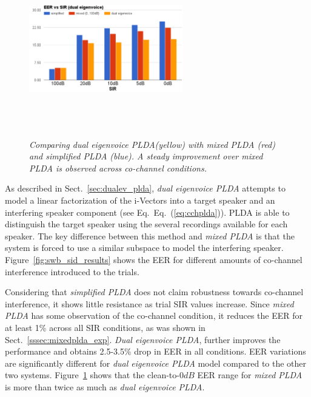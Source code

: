 \begin{figure}[b!]
	\centering
	\includegraphics[height = 3in, width=0.6\textwidth]{figures/eer_vs_sir_dualeigenvoice}
	\vspace{-2mm}
	\caption{\it \small Comparing {\it dual eigenvoice PLDA}(yellow) with {\it mixed PLDA} (red) and {\it simplified PLDA} (blue). A steady improvement over {\it mixed PLDA} is observed across co-channel conditions. }
	\label{fig:eer_dualeigenvoice}
	\vspace{-1mm}
\end{figure}

As described in Sect.~\ref{sec:dualev_plda}, {\it dual eigenvoice PLDA} attempts to model a linear factorization of the i-Vectors into a target speaker and an interfering speaker component (see Eq.~Eq.~(\ref{eq:cchplda})). 
PLDA is able to distinguish the target speaker using the several recordings available for each speaker. 
The key difference between this method and {\it mixed PLDA} is that the system is forced to use a similar subspace to model the interfering speaker. 
Figure~\ref{fig:swb_sid_results} shows the EER for different amounts of co-channel interference introduced to the trials. 

Considering that {\it simplified PLDA} does not claim robustness towards co-channel interference, it shows little resistance as trial SIR values increase. 
Since {\it mixed PLDA} has some observation of the co-channel condition, it reduces the EER for at least 1\% across all SIR conditions, as was shown in Sect.~\ref{sssec:mixedplda_exp}. {\it Dual eigenvoice PLDA}, further improves the performance and obtains 2.5-3.5\% drop in EER in all conditions. EER variations are significantly different for {\it dual eigenvoice PLDA} model compared to the other two systems. 
Figure~\ref{fig:eer_dualeigenvoice} shows that the clean-to-$0dB$ EER range for {\it mixed PLDA} is more than twice as much as {\it dual eigenvoice PLDA}. 


